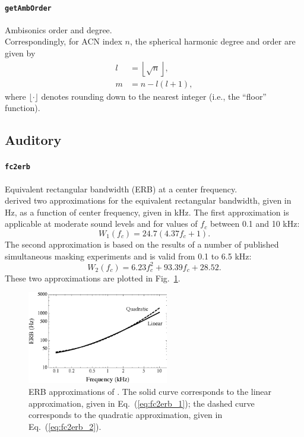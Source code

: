 \documentclass[11pt, oneside]{article}
\newcommand{\figref}[1]{Fig.~\ref{#1}}
\newcommand{\eqnref}[1]{Eq.~(\ref{#1})}
\newcommand{\function}[1]{\paragraph*{\texttt{#1}}}
\begin{document}
\function{getAmbOrder} Ambisonics order and degree. \\
Correspondingly, for ACN index $n$, the spherical harmonic degree and order are given by
\begin{equation}\label{eq:getAmbOrder}
\begin{aligned}
l &= \left\lfloor \sqrt{n} \right\rfloor,\\
m &= n - l (l + 1),
\end{aligned}
\end{equation}
where $\lfloor \cdot \rfloor$ denotes rounding down to the nearest integer (i.e., the ``floor'' function).

\subsection{Auditory}

\function{fc2erb} Equivalent rectangular bandwidth (ERB) at a center frequency. \\
\citet{GlasbergMoore1990} derived two approximations for the equivalent rectangular bandwidth, given in Hz, as a function of center frequency, given in kHz.
The first approximation is applicable at moderate sound levels and for values of $f_c$ between 0.1 and 10 kHz:
\begin{equation}\label{eq:fc2erb_1}
W_1(f_c) = 24.7(4.37 f_c + 1).
\end{equation}
The second approximation is based on the results of a number of published simultaneous masking experiments and is valid from 0.1 to 6.5 kHz:
\begin{equation}\label{eq:fc2erb_2}
W_2(f_c) = 6.23 f_c^2 + 93.39 f_c + 28.52.
\end{equation}
These two approximations are plotted in \figref{fig:fc2erb}.

\begin{figure}[tb]
    	\centering
    	\includegraphics[width=0.55\textwidth]{figures/fc2erb.eps}
    	\caption{ERB approximations of \citet[Fig.~7]{GlasbergMoore1990}.
	The solid curve corresponds to the linear approximation, given in \eqnref{eq:fc2erb_1};
	the dashed curve corresponds to the quadratic approximation, given in \eqnref{eq:fc2erb_2}.}
	\label{fig:fc2erb}
\end{figure}
\end{document}
